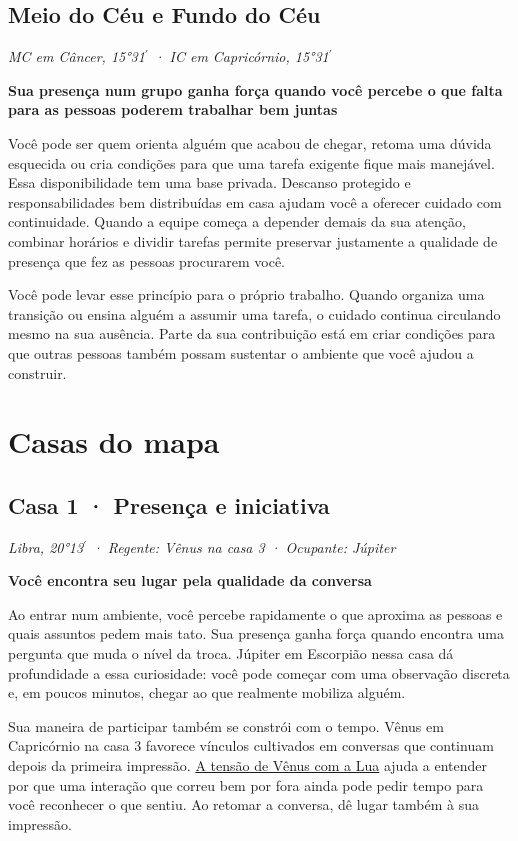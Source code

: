 \documentclass[11pt,a4paper]{article}
\newcommand{\leitura}[3]{\subsection{#1}\textit{#2}\par #3}
\newcommand{\subtituloleitura}[1]{\textbf{#1}\par\nopagebreak[4]}
\newcommand{\aspectoref}[2]{\hyperref[#1]{#2}}
\begin{document}
\leitura{Meio do Céu e Fundo do Céu}{MC em Câncer, 15°31\ensuremath{^{\prime}} · IC em Capricórnio, 15°31\ensuremath{^{\prime}}}{
\subtituloleitura{Sua presença num grupo ganha força quando você percebe o que falta para as pessoas poderem trabalhar bem juntas} Você pode ser quem orienta alguém que acabou de chegar, retoma uma dúvida esquecida ou cria condições para que uma tarefa exigente fique mais manejável. Essa disponibilidade tem uma base privada. Descanso protegido e responsabilidades bem distribuídas em casa ajudam você a oferecer cuidado com continuidade. Quando a equipe começa a depender demais da sua atenção, combinar horários e dividir tarefas permite preservar justamente a qualidade de presença que fez as pessoas procurarem você.

Você pode levar esse princípio para o próprio trabalho. Quando organiza uma transição ou ensina alguém a assumir uma tarefa, o cuidado continua circulando mesmo na sua ausência. Parte da sua contribuição está em criar condições para que outras pessoas também possam sustentar o ambiente que você ajudou a construir.
}

\clearpage

\section{Casas do mapa}

\leitura{Casa 1 · Presença e iniciativa}{Libra, 20°13\ensuremath{^{\prime}} · Regente: Vênus na casa 3 · Ocupante: Júpiter}{
\subtituloleitura{Você encontra seu lugar pela qualidade da conversa}
Ao entrar num ambiente, você percebe rapidamente o que aproxima as pessoas e quais assuntos pedem mais tato. Sua presença ganha força quando encontra uma pergunta que muda o nível da troca. Júpiter em Escorpião nessa casa dá profundidade a essa curiosidade: você pode começar com uma observação discreta e, em poucos minutos, chegar ao que realmente mobiliza alguém.

Sua maneira de participar também se constrói com o tempo. Vênus em Capricórnio na casa 3 favorece vínculos cultivados em conversas que continuam depois da primeira impressão. \aspectoref{aspecto:lua-venus}{A tensão de Vênus com a Lua} ajuda a entender por que uma interação que correu bem por fora ainda pode pedir tempo para você reconhecer o que sentiu. Ao retomar a conversa, dê lugar também à sua impressão.
}
\end{document}
